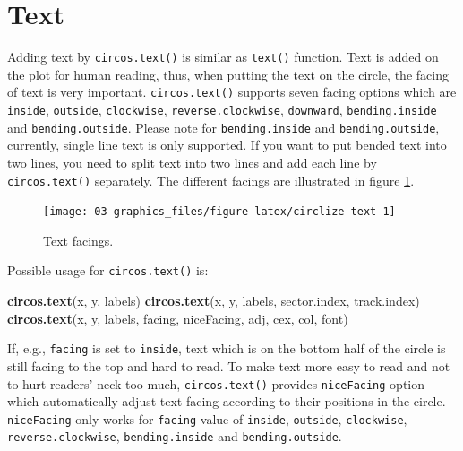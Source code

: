 \documentclass[]{book}
\newenvironment{Shaded}{\begin{snugshade}}{\end{snugshade}}
\newcommand{\KeywordTok}[1]{\textcolor[rgb]{0.13,0.29,0.53}{\textbf{#1}}}
\newcommand{\NormalTok}[1]{#1}
\theoremstyle{definition}
\theoremstyle{definition}
\theoremstyle{remark}
\begin{document}
\section{Text}\label{text}

Adding text by \texttt{circos.text()} is similar as \texttt{text()}
function. Text is added on the plot for human reading, thus, when
putting the text on the circle, the facing of text is very important.
\texttt{circos.text()} supports seven facing options which are
\texttt{inside}, \texttt{outside}, \texttt{clockwise},
\texttt{reverse.clockwise}, \texttt{downward}, \texttt{bending.inside}
and \texttt{bending.outside}. Please note for \texttt{bending.inside}
and \texttt{bending.outside}, currently, single line text is only
supported. If you want to put bended text into two lines, you need to
split text into two lines and add each line by \texttt{circos.text()}
separately. The different facings are illustrated in figure
\ref{fig:circlize-text}.

\begin{figure}

{\centering \texttt{[image: 03-graphics\_files/figure-latex/circlize-text-1]} 

}

\caption{Text facings.}\label{fig:circlize-text}
\end{figure}

Possible usage for \texttt{circos.text()} is:

\begin{Shaded}
\begin{Highlighting}[]
\KeywordTok{circos.text}\NormalTok{(x, y, labels)}
\KeywordTok{circos.text}\NormalTok{(x, y, labels, sector.index, track.index)}
\KeywordTok{circos.text}\NormalTok{(x, y, labels, facing, niceFacing, adj, cex, col, font)}
\end{Highlighting}
\end{Shaded}

If, e.g., \texttt{facing} is set to \texttt{inside}, text which is on
the bottom half of the circle is still facing to the top and hard to
read. To make text more easy to read and not to hurt readers' neck too
much, \texttt{circos.text()} provides \texttt{niceFacing} option which
automatically adjust text facing according to their positions in the
circle. \texttt{niceFacing} only works for \texttt{facing} value of
\texttt{inside}, \texttt{outside}, \texttt{clockwise},
\texttt{reverse.clockwise}, \texttt{bending.inside} and
\texttt{bending.outside}.
\end{document}
